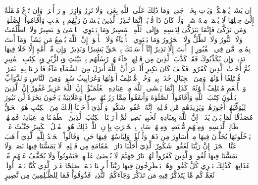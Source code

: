 إِن يَشَأۡ يُذۡهِبۡكُمۡ وَيَأۡتِ بِخَلۡقٖ جَدِيدٖ
وَمَا ذَٰلِكَ عَلَى ٱللَّهِ بِعَزِيزٖ
وَلَا تَزِرُ وَازِرَةٞ وِزۡرَ أُخۡرَىٰۚ وَإِن تَدۡعُ مُثۡقَلَةٌ إِلَىٰ حِمۡلِهَا لَا يُحۡمَلۡ مِنۡهُ شَيۡءٞ وَلَوۡ كَانَ ذَا قُرۡبَىٰٓۗ إِنَّمَا تُنذِرُ ٱلَّذِينَ يَخۡشَوۡنَ رَبَّهُم بِٱلۡغَيۡبِ وَأَقَامُواْ ٱلصَّلَوٰةَۚ وَمَن تَزَكَّىٰ فَإِنَّمَا يَتَزَكَّىٰ لِنَفۡسِهِۦۚ وَإِلَى ٱللَّهِ ٱلۡمَصِيرُ
وَمَا يَسۡتَوِي ٱلۡأَعۡمَىٰ وَٱلۡبَصِيرُ
وَلَا ٱلظُّلُمَٰتُ وَلَا ٱلنُّورُ
وَلَا ٱلظِّلُّ وَلَا ٱلۡحَرُورُ
وَمَا يَسۡتَوِي ٱلۡأَحۡيَآءُ وَلَا ٱلۡأَمۡوَٰتُۚ إِنَّ ٱللَّهَ يُسۡمِعُ مَن يَشَآءُۖ وَمَآ أَنتَ بِمُسۡمِعٖ مَّن فِي ٱلۡقُبُورِ
إِنۡ أَنتَ إِلَّا نَذِيرٌ
إِنَّآ أَرۡسَلۡنَٰكَ بِٱلۡحَقِّ بَشِيرٗا وَنَذِيرٗاۚ وَإِن مِّنۡ أُمَّةٍ إِلَّا خَلَا فِيهَا نَذِيرٞ
وَإِن يُكَذِّبُوكَ فَقَدۡ كَذَّبَ ٱلَّذِينَ مِن قَبۡلِهِمۡ جَآءَتۡهُمۡ رُسُلُهُم بِٱلۡبَيِّنَٰتِ وَبِٱلزُّبُرِ وَبِٱلۡكِتَٰبِ ٱلۡمُنِيرِ
ثُمَّ أَخَذۡتُ ٱلَّذِينَ كَفَرُواْۖ فَكَيۡفَ كَانَ نَكِيرِ
أَلَمۡ تَرَ أَنَّ ٱللَّهَ أَنزَلَ مِنَ ٱلسَّمَآءِ مَآءٗ فَأَخۡرَجۡنَا بِهِۦ ثَمَرَٰتٖ مُّخۡتَلِفًا أَلۡوَٰنُهَاۚ وَمِنَ ٱلۡجِبَالِ جُدَدُۢ بِيضٞ وَحُمۡرٞ مُّخۡتَلِفٌ أَلۡوَٰنُهَا وَغَرَابِيبُ سُودٞ
وَمِنَ ٱلنَّاسِ وَٱلدَّوَآبِّ وَٱلۡأَنۡعَٰمِ مُخۡتَلِفٌ أَلۡوَٰنُهُۥ كَذَٰلِكَۗ إِنَّمَا يَخۡشَى ٱللَّهَ مِنۡ عِبَادِهِ ٱلۡعُلَمَـٰٓؤُاْۗ إِنَّ ٱللَّهَ عَزِيزٌ غَفُورٌ
إِنَّ ٱلَّذِينَ يَتۡلُونَ كِتَٰبَ ٱللَّهِ وَأَقَامُواْ ٱلصَّلَوٰةَ وَأَنفَقُواْ مِمَّا رَزَقۡنَٰهُمۡ سِرّٗا وَعَلَانِيَةٗ يَرۡجُونَ تِجَٰرَةٗ لَّن تَبُورَ
لِيُوَفِّيَهُمۡ أُجُورَهُمۡ وَيَزِيدَهُم مِّن فَضۡلِهِۦٓۚ إِنَّهُۥ غَفُورٞ شَكُورٞ
وَٱلَّذِيٓ أَوۡحَيۡنَآ إِلَيۡكَ مِنَ ٱلۡكِتَٰبِ هُوَ ٱلۡحَقُّ مُصَدِّقٗا لِّمَا بَيۡنَ يَدَيۡهِۗ إِنَّ ٱللَّهَ بِعِبَادِهِۦ لَخَبِيرُۢ بَصِيرٞ
ثُمَّ أَوۡرَثۡنَا ٱلۡكِتَٰبَ ٱلَّذِينَ ٱصۡطَفَيۡنَا مِنۡ عِبَادِنَاۖ فَمِنۡهُمۡ ظَالِمٞ لِّنَفۡسِهِۦ وَمِنۡهُم مُّقۡتَصِدٞ وَمِنۡهُمۡ سَابِقُۢ بِٱلۡخَيۡرَٰتِ بِإِذۡنِ ٱللَّهِۚ ذَٰلِكَ هُوَ ٱلۡفَضۡلُ ٱلۡكَبِيرُ
جَنَّـٰتُ عَدۡنٖ يَدۡخُلُونَهَا يُحَلَّوۡنَ فِيهَا مِنۡ أَسَاوِرَ مِن ذَهَبٖ وَلُؤۡلُؤٗاۖ وَلِبَاسُهُمۡ فِيهَا حَرِيرٞ
وَقَالُواْ ٱلۡحَمۡدُ لِلَّهِ ٱلَّذِيٓ أَذۡهَبَ عَنَّا ٱلۡحَزَنَۖ إِنَّ رَبَّنَا لَغَفُورٞ شَكُورٌ
ٱلَّذِيٓ أَحَلَّنَا دَارَ ٱلۡمُقَامَةِ مِن فَضۡلِهِۦ لَا يَمَسُّنَا فِيهَا نَصَبٞ وَلَا يَمَسُّنَا فِيهَا لُغُوبٞ
وَٱلَّذِينَ كَفَرُواْ لَهُمۡ نَارُ جَهَنَّمَ لَا يُقۡضَىٰ عَلَيۡهِمۡ فَيَمُوتُواْ وَلَا يُخَفَّفُ عَنۡهُم مِّنۡ عَذَابِهَاۚ كَذَٰلِكَ نَجۡزِي كُلَّ كَفُورٖ
وَهُمۡ يَصۡطَرِخُونَ فِيهَا رَبَّنَآ أَخۡرِجۡنَا نَعۡمَلۡ صَٰلِحًا غَيۡرَ ٱلَّذِي كُنَّا نَعۡمَلُۚ أَوَلَمۡ نُعَمِّرۡكُم مَّا يَتَذَكَّرُ فِيهِ مَن تَذَكَّرَ وَجَآءَكُمُ ٱلنَّذِيرُۖ فَذُوقُواْ فَمَا لِلظَّـٰلِمِينَ مِن نَّصِيرٍ
